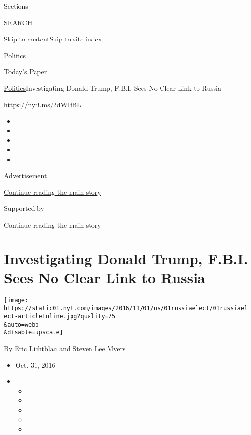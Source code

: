 Sections

SEARCH

\protect\hyperlink{site-content}{Skip to
content}\protect\hyperlink{site-index}{Skip to site index}

\href{https://www.nytimes.com/section/politics}{Politics}

\href{https://myaccount.nytimes.com/auth/login?response_type=cookie\&client_id=vi}{}

\href{https://www.nytimes.com/section/todayspaper}{Today's Paper}

\href{/section/politics}{Politics}\textbar{}Investigating Donald Trump,
F.B.I. Sees No Clear Link to Russia

\url{https://nyti.ms/2dWIfBL}

\begin{itemize}
\item
\item
\item
\item
\item
\end{itemize}

Advertisement

\protect\hyperlink{after-top}{Continue reading the main story}

Supported by

\protect\hyperlink{after-sponsor}{Continue reading the main story}

\hypertarget{investigating-donald-trump-fbi-sees-no-clear-link-to-russia}{%
\section{Investigating Donald Trump, F.B.I. Sees No Clear Link to
Russia}\label{investigating-donald-trump-fbi-sees-no-clear-link-to-russia}}

\texttt{[image: https://static01.nyt.com/images/2016/11/01/us/01russiaelect/01russiaelect-articleInline.jpg?quality=75\\\&auto=webp\\\&disable=upscale]}

By \href{https://www.nytimes.com/by/eric-lichtblau}{Eric Lichtblau} and
\href{https://www.nytimes.com/by/steven-lee-myers}{Steven Lee Myers}

\begin{itemize}
\item
  Oct. 31, 2016
\item
  \begin{itemize}
  \item
  \item
  \item
  \item
  \item
  \end{itemize}
\end{itemize}

